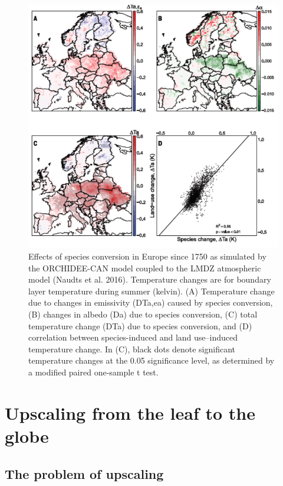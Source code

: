 \documentclass[12pt,oneside]{book}
\begin{document}
\begin{figure}

{\centering \includegraphics[width=0.8\linewidth]{figures/chap8/f817_naudts2} 

}

\caption{Effects of species conversion in Europe since 1750 as simulated by the ORCHIDEE-CAN model coupled to the LMDZ atmospheric model (Naudts et al. 2016). Temperature changes are for boundary layer temperature during summer (kelvin). (A) Temperature change due to changes in emissivity (DTa,ea) caused by species conversion, (B) changes in albedo (Da) due to species conversion, (C) total temperature change (DTa) due to species conversion, and (D) correlation between species-induced and land use–induced temperature change. In (C), black dots denote significant temperature changes at the 0.05 significance level, as determined by a modified paired one-sample t test.}\label{fig:f817}
\end{figure}

\chapter{Upscaling from the leaf to the
globe}\label{upscaling-from-the-leaf-to-the-globe}


\section{The problem of upscaling}\label{the-problem-of-upscaling}
\end{document}
